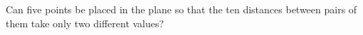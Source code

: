 Can five points be placed in the plane so that the ten distances between pairs of them take only two different values?
